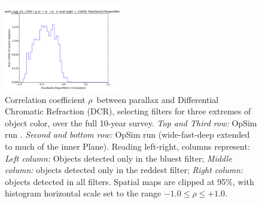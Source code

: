 \begin{figure}[ht]
\begin{center}
  \includegraphics[width=2.0in]{./figs/milkyway/astromPanels/MW_Astrom_paDcrDegen_wfdPlane_10y_hst.png}
  \end{center}
  \caption{Correlation coefficient $\rho$~between parallax and Differential Chromatic Refraction (DCR), selecting filters for three extremes of object color, over the full 10-year survey. {\it Top and Third row:} OpSim run . {\it Second and bottom row:} OpSim run  (wide-fast-deep extended to much of the inner Plane). Reading left-right, columns represent: {\it Left column:} Objects detected only in the bluest filter; {\it Middle column:} objects detected only in the reddest filter; {\it Right column:} objects detected in all filters. Spatial maps are clipped at 95\%, with histogram horizontal scale set to the range $-1.0 \le \rho \le +1.0$.}
  \label{fig_astrom_ByFilter_PADegen}
\end{figure}

